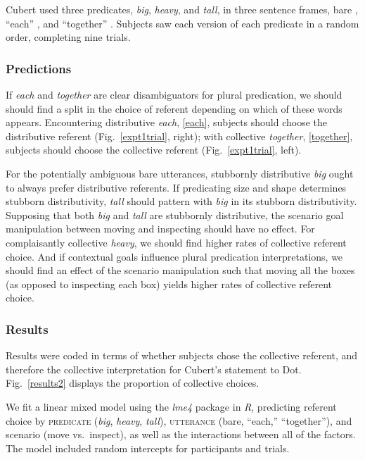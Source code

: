 \documentclass[linguex]{sp}
\begin{document}
 Cubert used three predicates, \emph{big}, \emph{heavy}, and \emph{tall}, in three sentence frames, bare \Last[a], ``each'' \Last[b], and ``together'' \Last[c]. Subjects saw each version of each predicate in a random order, completing nine trials. 

\subsubsection{Predictions}

If \emph{each} and \emph{together} are clear disambiguators for plural predication, we should should find a split in the choice of referent depending on which of these words appears. Encountering distributive \emph{each}, \ref{each}, subjects should choose the distributive referent (Fig.~\ref{expt1trial}, right); with collective \emph{together}, \ref{together}, subjects should choose the collective referent (Fig.~\ref{expt1trial}, left). 

For the potentially ambiguous bare utterances, stubbornly distributive \emph{big} ought to always prefer distributive referents. If predicating size and shape determines stubborn distributivity, \emph{tall} should pattern with \emph{big} in its stubborn distributivity. Supposing that both \emph{big} and \emph{tall} are stubbornly distributive, the scenario goal manipulation between moving and inspecting should have no effect. For complaisantly collective \emph{heavy}, we should find higher rates of collective referent choice. And if contextual goals influence plural predication interpretations, we should find an effect of the scenario manipulation such that moving all the boxes (as opposed to inspecting each box) yields higher rates of collective referent choice.

\subsubsection{Results}

Results were coded in terms of whether subjects chose the collective referent, and therefore the collective interpretation for Cubert's statement to Dot. Fig.\ \ref{results2} displays the proportion of collective choices.

We fit a linear mixed model \citep{baayenetal2008} using the \emph{lme4} package \citep{batesetal2014} in \emph{R}, predicting referent choice by \textsc{predicate} (\emph{big}, \emph{heavy}, \emph{tall}), \textsc{utterance} (bare, ``each,'' ``together''), and scenario (move vs.~inspect), as well as the interactions between all of the factors. The model included random intercepts for participants and trials.
\end{document}
